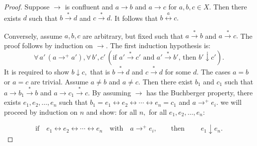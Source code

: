 \documentclass[
  letterpaper,
  10pt,
  reqno,
  twopage,
  openany]{book}
\theoremstyle{plain}
\theoremstyle{definition}
\theoremstyle{definition}
\theoremstyle{definition}
\theoremstyle{plain}
\theoremstyle{plain}
\theoremstyle{remark}
\begin{document}
\begin{proof}

Suppose \(\longrightarrow\) is confluent and \(a \longrightarrow b\) and
\(a \longrightarrow c\) for \(a, b, c \in X.\) Then there exists \(d\)
such that \(b\stackrel{*}{\longrightarrow} d\) and
\(c\stackrel{*}{\longrightarrow} d.\) It follows that
\(b \stackrel{a}{\longleftrightarrow} c.\)

Conversely, assume \(a, b, c\) are arbitrary, but fixed such that
\(a \stackrel{*}{\longrightarrow} b\) and
\(a \stackrel{*}{\longrightarrow} c.\) The proof follows by induction on
\(\longrightarrow.\) The first induction hypothesis is:\\
\[
\forall \, a' \, (a\longrightarrow^+ a'), \forall \, b', c' \, (\text{if }  a' \stackrel{*}{\longrightarrow} c'  \text{ and } a' \stackrel{*}{\longrightarrow} b'  \text{, then } b' \downarrow c').
\] It is required to show \(b \downarrow c,\) that is
\(b \stackrel{*}{\longrightarrow} d\) and
\(c \stackrel{*}{\longrightarrow} d\) for some \(d.\) The cases \(a=b\)
or \(a=c\) are trivial. Assume \(a \neq b\) and \(a \neq c.\) Then there
exist \(b_1\) and \(c_1\) such that
\(a \longrightarrow b_1 \stackrel{*}{\longrightarrow} b\) and
\(a \longrightarrow c_1 \stackrel{*}{\longrightarrow} c.\) By assuming
\(\longrightarrow\) has the Buchberger property, there exists
\(e_1, e_2, \ldots , e_n\) such that
\(b_1=e_1 \longleftrightarrow e_2 \longleftrightarrow \cdots \longleftrightarrow e_n=c_1\)
and \(a\longrightarrow^+ e_i.\) we will proceed by induction on \(n\)
and show: for all \(n,\) for all \(e_1, e_2, \ldots,e_n\):

\begin{equation}
\label{conflutwo}
\text{if} \quad  e_1 \longleftrightarrow e_2 \longleftrightarrow \cdots  \longleftrightarrow e_n \quad \text{with} \quad   a\longrightarrow^+ e_i , \qquad \text{then } \qquad e_1\downarrow e_n.
\tag{*}
\end{equation}


\end{proof}
\end{document}
